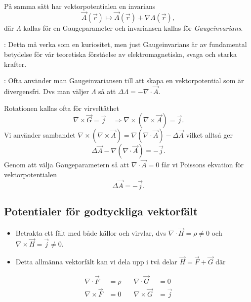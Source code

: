 \documentclass[%
oneside,                 %
final,                   %
10pt]{article}
\newcommand{\longinlinecomment}[3]{{\color{red}{\bf #1}: #2}}
\begin{document}
På samma sätt har vektorpotentialen en invarians
\begin{equation}
\vec{A}(\vec{r}) \mapsto \vec{A}(\vec{r}) + \nabla \Lambda(\vec{r}),
\end{equation}
där $\Lambda$ kallas för en Gaugeparameter och invariansen kallas för \emph{Gaugeinvarians}. 

\longinlinecomment{Kommentar 5}{ Detta må verka som en kuriositet, men just Gaugeinvarians är av fundamental betydelse för vår teoretiska förståelse av elektromagnetiska, svaga och starka krafter. }{ Detta må verka som }

\longinlinecomment{Kommentar 6}{ Ofta använder man Gaugeinvariansen till att skapa en vektorpotential som är divergensfri. Dvs man väljer $\Lambda$ så att $\Delta \Lambda = -\nabla \cdot \vec{A}$. }{ Ofta använder man Gaugeinvariansen }

Rotationen kallas ofta för virveltäthet
$$
\nabla \times \vec{G} = \vec{j} \quad \Rightarrow \nabla \times (\nabla \times \vec{A}) = \vec{j}.
$$
Vi använder sambandet $\nabla \times \left( \nabla \times \vec{A} \right) = \nabla \left( \nabla \cdot \vec{A} \right) - \Delta \vec{A}$ vilket alltså ger
$$
\Delta \vec{A} - \nabla \left( \nabla \cdot \vec{A} \right) = -\vec{j}.
$$
Genom att välja Gaugeparametern så att $\nabla \cdot \vec{A} = 0$ får vi Poissons ekvation för vektorpotentialen
\begin{equation}
\Delta \vec{A} = -\vec{j}.
\end{equation}

\subsection{Potentialer för godtyckliga vektorfält}

\begin{itemize}
\item Betrakta ett fält med både källor och virvlar, dvs $\nabla \cdot \vec{H} = \rho \neq 0$ och $\nabla \times \vec{H} = \vec{j} \neq 0$.

\item Detta allmänna vektorfält kan vi dela upp i två delar $\vec{H} = \vec{F} + \vec{G}$ där
\end{itemize}

\noindent
\begin{align}
\nabla \cdot \vec{F} &= \rho \quad  &\nabla \cdot \vec{G} &= 0 \\
\nabla \times \vec{F} &= 0 \quad  &\nabla \times \vec{G} &= \vec{j}
\end{align}
\end{document}
